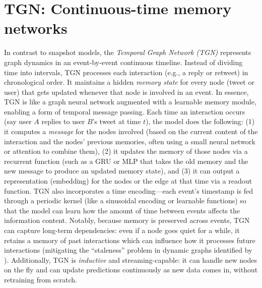 \documentclass{cshonours}
\begin{document}
\section*{TGN: Continuous-time memory networks}
In contrast to snapshot models, the \emph{Temporal Graph Network (TGN)} \cite{rossi2020tgn} represents graph dynamics in an event-by-event continuous timeline. Instead of dividing time into intervals, TGN processes each interaction (e.g., a reply or retweet) in chronological order. It maintains a hidden \emph{memory state} for every node (tweet or user) that gets updated whenever that node is involved in an event. In essence, TGN is like a graph neural network augmented with a learnable memory module, enabling a form of temporal message passing. Each time an interaction occurs (say user $A$ replies to user $B$’s tweet at time $t$), the model does the following: (1) it computes a \emph{message} for the nodes involved (based on the current content of the interaction and the nodes’ previous memories, often using a small neural network or attention to combine them), (2) it updates the memory of those nodes via a recurrent function (such as a GRU or MLP that takes the old memory and the new message to produce an updated memory state), and (3) it can output a representation (embedding) for the nodes or the edge at that time via a readout function. TGN also incorporates a time encoding—each event’s timestamp is fed through a periodic kernel (like a sinusoidal encoding or learnable functions) so that the model can learn how the amount of time between events affects the information content. Notably, because memory is preserved across events, TGN can capture long-term dependencies: even if a node goes quiet for a while, it retains a memory of past interactions which can influence how it processes future interactions (mitigating the “staleness” problem in dynamic graphs identified by \cite{rai2020stale}). Additionally, TGN is \emph{inductive} and streaming-capable: it can handle new nodes on the fly and can update predictions continuously as new data comes in, without retraining from scratch.
\end{document}
